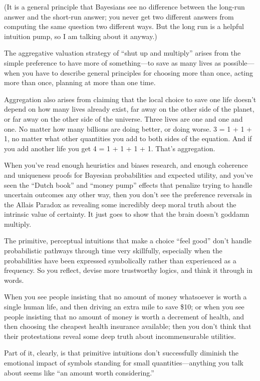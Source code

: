 {
 (It is a general principle that Bayesians see no difference
between the long-run answer and the short-run answer; you never get two
different answers from computing the same question two different ways.
But the long run is a helpful intuition pump, so I am talking about it
anyway.)}

{
 The aggregative valuation strategy of ``shut up
and multiply'' arises from the simple preference to
have more of something---to save as many lives as possible---when you
have to describe general principles for choosing more than once, acting
more than once, planning at more than one time.}

{
 Aggregation also arises from claiming that the local choice to
save one life doesn't depend on how many lives already
exist, far away on the other side of the planet, or far away on the
other side of the universe. Three lives are one and one and one. No
matter how many billions are doing better, or doing worse. 3 = 1 + 1 +
1, no matter what other quantities you add to both sides of the
equation. And if you add another life you get 4 = 1 + 1 + 1 + 1.
That's aggregation.}

{
 When you've read enough heuristics and biases
research, and enough coherence and uniqueness proofs for Bayesian
probabilities and expected utility, and you've seen the
``Dutch book'' and
``money pump'' effects that penalize
trying to handle uncertain outcomes any other way, then you
don't see the preference reversals in the Allais
Paradox as revealing some incredibly deep moral truth about the
intrinsic value of certainty. It just goes to show that the brain
doesn't goddamn multiply.}

{
 The primitive, perceptual intuitions that make a choice
``feel good'' don't
handle probabilistic pathways through time very skillfully, especially
when the probabilities have been expressed symbolically rather than
experienced as a frequency. So you reflect, devise more trustworthy
logics, and think it through in words.}

{
 When you see people insisting that no amount of money whatsoever
is worth a single human life, and then driving an extra mile to save
\$10; or when you see people insisting that no amount of money is worth
a decrement of health, and then choosing the cheapest health insurance
available; then you don't think that their
protestations reveal some deep truth about incommensurable utilities.}

{
 Part of it, clearly, is that primitive intuitions
don't successfully diminish the emotional impact of
symbols standing for small quantities---anything you talk about seems
like ``an amount worth
considering.''}

